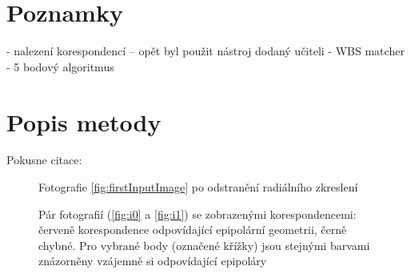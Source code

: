 \documentclass[11pt,oneside,a4paper,pdftex]{article}   %
\begin{document}
\section{Poznamky}

- nalezení korespondencí -- opět byl použit nástroj dodaný učiteli - WBS matcher
- 5 bodový algoritmus \cite{stewenius-engels-nister-isprsj-2006}

%


\section{Popis metody}

Pokusne citace:
\cite{Hartley2004}
\cite{SaraLectures}



	\begin{figure}[htb]
		\centering
		\caption{Fotografie \ref{fig:firstInputImage} po odstranění radiálního zkreslení}
		\label{fig:linearizedPictureExample}
	\end{figure}

	\begin{figure}[htb]
			\centering
		\caption{Pár fotografií (\ref{fig:i0} a \ref{fig:i1}) se zobrazenými korespondencemi: červeně korespondence odpovídající
			epipolární geometrii, černě chybné. Pro vybrané body (označené křížky) jsou stejnými barvami znázorněny vzájemně si
			odpovídající epipoláry}
		\label{fig:pairWithEpipolars}
	\end{figure}
\end{document}
